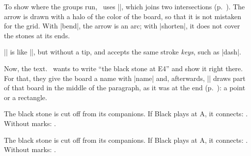 \begin{goban}
To show where the groups run, \karu\ uses |\arrow|, which joins two intersections (p.~\pageref{subsec:flechas}). The arrow is drawn with a halo of the color of the board, so that it is not mistaken for the grid. With |bend|, the arrow is an arc; with |shorten|, it does not cover the stones at its ends.

\begin{codeexample}[width=4.8cm]
	\begin{goban}[partial = A1:G7, label = {at = {north, west}}]
	\end{goban}
\end{codeexample}

|\line| is like |\arrow|, but without a tip, and accepts the same stroke \emph{keys}, such as |dash|.

\begin{codeexample}[width=4.8cm]
	\begin{goban}[partial = A1:G7, label = {at = {north, west}}]
	\end{goban}
\end{codeexample}

Now, the text. \karu\ wants to write ``the black stone at E4'' and show it right there. For that, they give the board a name with |name| and, afterwards, |\pgfgoview| draws part of that board in the middle of the paragraph, as it was at the end (p.~\pageref{subsec:vistas}): a point or a rectangle.

\begin{codeexample}[width=4.8cm]
	\begin{goban}[partial = A1:G7, name = fight]
	\end{goban}
\end{codeexample}

\begin{codeexample}
	The black stone  is cut off from its companions.
	If Black plays at A, it connects: .
	Without marks: .
\end{codeexample}

The black stone  is cut off from its companions.
If Black plays at A, it connects: .
Without marks: .


\end{goban}
